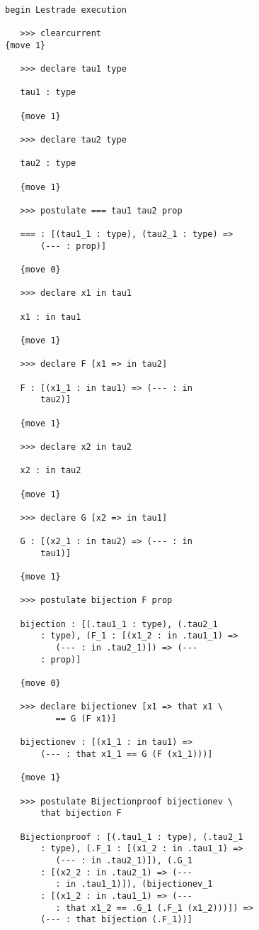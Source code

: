 \documentclass[12pt]{article}
\begin{document}
\begin{verbatim}

begin Lestrade execution

   >>> clearcurrent
{move 1}

   >>> declare tau1 type

   tau1 : type

   {move 1}

   >>> declare tau2 type

   tau2 : type

   {move 1}

   >>> postulate === tau1 tau2 prop

   === : [(tau1_1 : type), (tau2_1 : type) => 
       (--- : prop)]

   {move 0}

   >>> declare x1 in tau1

   x1 : in tau1

   {move 1}

   >>> declare F [x1 => in tau2]

   F : [(x1_1 : in tau1) => (--- : in 
       tau2)]

   {move 1}

   >>> declare x2 in tau2

   x2 : in tau2

   {move 1}

   >>> declare G [x2 => in tau1]

   G : [(x2_1 : in tau2) => (--- : in 
       tau1)]

   {move 1}

   >>> postulate bijection F prop

   bijection : [(.tau1_1 : type), (.tau2_1 
       : type), (F_1 : [(x1_2 : in .tau1_1) => 
          (--- : in .tau2_1)]) => (--- 
       : prop)]

   {move 0}

   >>> declare bijectionev [x1 => that x1 \
          == G (F x1)]

   bijectionev : [(x1_1 : in tau1) => 
       (--- : that x1_1 == G (F (x1_1)))]

   {move 1}

   >>> postulate Bijectionproof bijectionev \
       that bijection F

   Bijectionproof : [(.tau1_1 : type), (.tau2_1 
       : type), (.F_1 : [(x1_2 : in .tau1_1) => 
          (--- : in .tau2_1)]), (.G_1 
       : [(x2_2 : in .tau2_1) => (--- 
          : in .tau1_1)]), (bijectionev_1 
       : [(x1_2 : in .tau1_1) => (--- 
          : that x1_2 == .G_1 (.F_1 (x1_2)))]) => 
       (--- : that bijection (.F_1))]


\end{verbatim}
\end{document}
